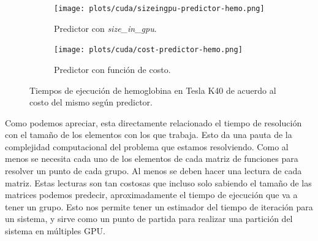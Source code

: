 %
%
\begin{figure}[htbp]
   \centering
   \begin{subfigure}[b]{\plotwidthtres}
    \texttt{[image: plots/cuda/sizeingpu-predictor-hemo.png]}
     \caption{Predictor con \textit{size\_in\_gpu}.}
   \end{subfigure}
   \begin{subfigure}[b]{\plotwidthtres}
    \texttt{[image: plots/cuda/cost-predictor-hemo.png]}
     \caption{Predictor con funci\'on de costo.}
   \end{subfigure}
   \caption{Tiempos de ejecuci\'on de hemoglobina en Tesla K40 de acuerdo al costo del mismo seg\'un predictor.}
   \label{plt:runtime-predictor}
\end{figure}

Como podemos apreciar, esta directamente relacionado el tiempo de resoluci\'on con el tama\~no
de los elementos con los que trabaja. Esto da una pauta de la complejidad computacional del problema
que estamos resolviendo. Como al menos se necesita cada uno de los elementos de cada matriz de funciones
para resolver un punto de cada grupo. Al menos se deben hacer una lectura de cada matriz. Estas lecturas
son tan costosas que incluso solo sabiendo el tama\~no de las matrices podemos predecir, aproximadamente
el tiempo de ejecuci\'on que va a tener un grupo. Esto nos permite tener un estimador del tiempo de
iteraci\'on para un sistema, y sirve como un punto de partida para realizar una partici\'on
del sistema en m\'ultiples GPU.

